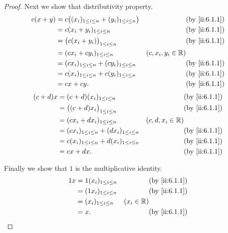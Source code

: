 \begin{proof}
  Next we show that distributivity property.
  \begin{align*}
    c(x + y) & = c\big((x_i)_{1 \leq i \leq n} + (y_i)_{1 \leq i \leq n}\big) &                      & \by{ii:6.1.1} \\
             & = c(x_i + y_i)_{1 \leq i \leq n}                               &                      & \by{ii:6.1.1} \\
             & = \big(c(x_i + y_i)\big)_{1 \leq i \leq n}                     &                      & \by{ii:6.1.1} \\
             & = (c x_i + c y_i)_{1 \leq i \leq n}                            & (c, x_i, y_i \in \R)                 \\
             & = (c x_i)_{1 \leq i \leq n} + (c y_i)_{1 \leq i \leq n}        &                      & \by{ii:6.1.1} \\
             & = c(x_i)_{1 \leq i \leq n} + c(y_i)_{1 \leq i \leq n}          &                      & \by{ii:6.1.1} \\
             & = cx + cy.                                                     &                      & \by{ii:6.1.1}
  \end{align*}
  \begin{align*}
    (c + d)x & = (c + d)(x_i)_{1 \leq i \leq n}                        &                    & \by{ii:6.1.1} \\
             & = \big((c + d) x_i\big)_{1 \leq i \leq n}               &                    & \by{ii:6.1.1} \\
             & = (c x_i + d x_i)_{1 \leq i \leq n}                     & (c, d, x_i \in \R)                 \\
             & = (c x_i)_{1 \leq i \leq n} + (d x_i)_{1 \leq i \leq n} &                    & \by{ii:6.1.1} \\
             & = c(x_i)_{1 \leq i \leq n} + d(x_i)_{1 \leq i \leq n}   &                    & \by{ii:6.1.1} \\
             & = cx + dx.                                              &                    & \by{ii:6.1.1}
  \end{align*}

  Finally we show that \(1\) is the multiplicative identity.
  \begin{align*}
    1 x & = 1 (x_i)_{1 \leq i \leq n} &              & \by{ii:6.1.1} \\
        & = (1 x_i)_{1 \leq i \leq n} &              & \by{ii:6.1.1} \\
        & = (x_i)_{1 \leq i \leq n}   & (x_i \in \R)                 \\
        & = x.                        &              & \by{ii:6.1.1}
  \end{align*}
\end{proof}

